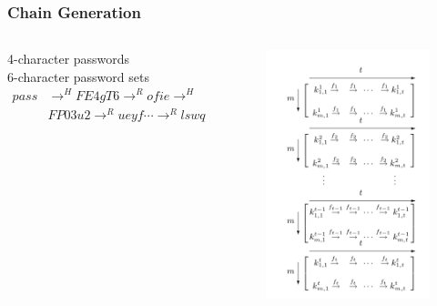 \documentclass{beamer}
\begin{document}
\begin{frame}
\frametitle{Chain Generation}
\begin{columns}[c]
\begin{example}
4-character passwords \\
6-character password sets
\begin{align*}
pass & \rightarrow^H FE4gT6 \rightarrow^R ofie \rightarrow^H \\ & FP03u2 \rightarrow^R ueyf \dotsb \rightarrow^R lswq
\end{align*}
\end{example}
\begin{figure}
\includegraphics[width=0.9\linewidth]{figs/classic}
\end{figure}
\end{columns}
\end{frame}
\end{document}
